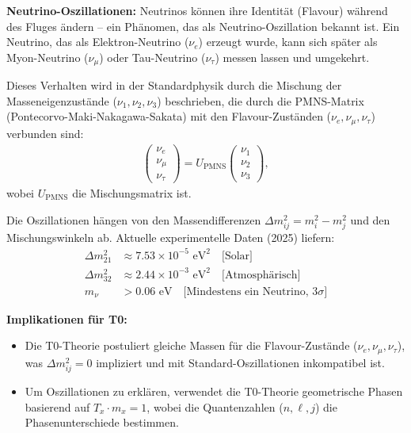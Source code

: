 	\begin{important}
		\textbf{Neutrino-Oszillationen:} Neutrinos können ihre Identität (Flavour) während des Fluges ändern – ein Phänomen, das als Neutrino-Oszillation bekannt ist. Ein Neutrino, das als Elektron-Neutrino (\(\nu_e\)) erzeugt wurde, kann sich später als Myon-Neutrino (\(\nu_\mu\)) oder Tau-Neutrino (\(\nu_\tau\)) messen lassen und umgekehrt.
		
		Dieses Verhalten wird in der Standardphysik durch die Mischung der Masseneigenzustände (\(\nu_1, \nu_2, \nu_3\)) beschrieben, die durch die PMNS-Matrix (Pontecorvo-Maki-Nakagawa-Sakata) mit den Flavour-Zuständen (\(\nu_e, \nu_\mu, \nu_\tau\)) verbunden sind:
		\begin{align}
			\begin{pmatrix}
				\nu_e \\ \nu_\mu \\ \nu_\tau
			\end{pmatrix}
			=
			U_{\text{PMNS}}
			\begin{pmatrix}
				\nu_1 \\ \nu_2 \\ \nu_3
			\end{pmatrix},
		\end{align}
		wobei \(U_{\text{PMNS}}\) die Mischungsmatrix ist.
		
		Die Oszillationen hängen von den Massendifferenzen \(\Delta m^2_{ij} = m_i^2 - m_j^2\) und den Mischungswinkeln ab. Aktuelle experimentelle Daten (2025) liefern:
		\begin{align}
			\Delta m^2_{21} &\approx 7.53 \times 10^{-5} \text{ eV}^2 \quad \text{[Solar]} \\
			\Delta m^2_{32} &\approx 2.44 \times 10^{-3} \text{ eV}^2 \quad \text{[Atmosphärisch]} \\
			m_\nu &> 0.06 \text{ eV} \quad \text{[Mindestens ein Neutrino, 3}\sigma\text{]}
		\end{align}
		
		\textbf{Implikationen für T0:}
		\begin{itemize}
			\item Die T0-Theorie postuliert gleiche Massen für die Flavour-Zustände (\(\nu_e, \nu_\mu, \nu_\tau\)), was \(\Delta m^2_{ij} = 0\) impliziert und mit Standard-Oszillationen inkompatibel ist.
			\item Um Oszillationen zu erklären, verwendet die T0-Theorie geometrische Phasen basierend auf \( T_x \cdot m_x = 1 \), wobei die Quantenzahlen (\(n, \ell, j\)) die Phasenunterschiede bestimmen.
		\end{itemize}
	\end{important}
	
